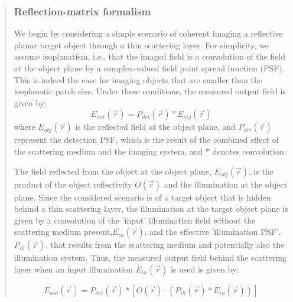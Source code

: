 \documentclass[12pt]{article}
\newenvironment{ourresponse}
    {\begin{tcolorbox}[width=\linewidth,breakable,enhanced,colback=gray!5,colframe=responsecolor!50,title=Response,left=5pt,right=5pt]}
    {\end{tcolorbox}}
\begin{document}
\begin{ourresponse}
\begin{quote}
\subsubsection*{Reflection-matrix formalism}

We begin by considering a simple scenario of coherent imaging a reflective planar target object through a thin scattering layer. For simplicity, we assume isoplanatism, i.e., that the imaged field is a convolution of the field at the object plane by a complex-valued field point spread function (PSF). This is indeed the case for imaging objects that are smaller than the isoplanatic patch size\cite{bertolotti2022imaging, weinberg2024noninvasive}.
Under these conditions, the measured output field is given by:
\begin{equation}
E_{out}(\vec{r}) = P_{det}(\vec{r}) * E_{obj}(\vec{r})
\end{equation}
where $E_{obj}(\vec{r})$ is the reflected field at the object plane, and  $P_{det}(\vec{r})$ represent the detection PSF, which is the result of the combined effect of the scattering medium and the imaging system, and $*$ denotes convolution.

The field reflected from the object at the object plane, $E_{obj}(\vec{r})$, is the product of the object reflectivity $O(\vec{r}) $ and the illumination at the object plane. Since the considered scenario is of a target object that is hidden behind a thin scattering layer, the illumination at the target object plane is given by a convolution of the 'input' illumination field without the scattering medium present,$E_{in}(\vec{r})$, and the effective 'illumination PSF',  $P_{ill}(\vec{r})$, that results from the scattering medium and potentially also the illumination system. Thus, the measured output field behind the scattering layer when an input illumination $E_{in}(\vec{r})$ is used is given by:

\begin{equation}
E_{out}(\vec{r}) = P_{det}(\vec{r}) * [O(\vec{r}) \cdot (P_{ill}(\vec{r}) * E_{in}(\vec{r}))]
\label{eq: fund. imaging}
\end{equation}




\end{quote}
\end{ourresponse}
\end{document}
